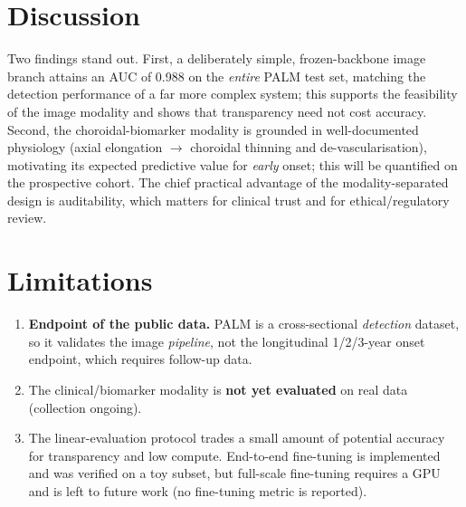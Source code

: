 \documentclass[11pt]{article}
\begin{document}
\section{Discussion}
Two findings stand out. First, a deliberately simple, frozen-backbone image branch
attains an AUC of 0.988 on the \emph{entire} PALM test set, matching the detection
performance of a far more complex system; this supports the feasibility of the
image modality and shows that transparency need not cost accuracy. Second, the
choroidal-biomarker modality is grounded in well-documented physiology (axial
elongation $\rightarrow$ choroidal thinning and de-vascularisation), motivating its
expected predictive value for \emph{early} onset; this will be quantified on the
prospective cohort. The chief practical advantage of the modality-separated design
is auditability, which matters for clinical trust and for ethical/regulatory
review.

\section{Limitations}
\begin{enumerate}[leftmargin=1.4em,itemsep=1pt]
  \item \textbf{Endpoint of the public data.} PALM is a cross-sectional
  \emph{detection} dataset, so it validates the image \emph{pipeline}, not the
  longitudinal 1/2/3-year onset endpoint, which requires follow-up data.
  \item The clinical/biomarker modality is \textbf{not yet evaluated} on real data
  (collection ongoing).
  \item The linear-evaluation protocol trades a small amount of potential accuracy
  for transparency and low compute. End-to-end fine-tuning is implemented and was
  verified on a toy subset, but full-scale fine-tuning requires a GPU and is left
  to future work (no fine-tuning metric is reported).
\end{enumerate}

\end{document}
